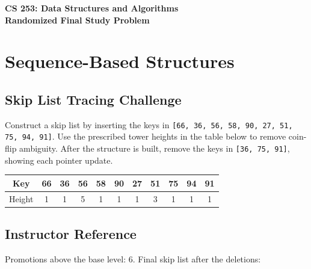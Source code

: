 \documentclass[11pt]{article}
\begin{document}
\begin{center}
    \Large\textbf{CS 253: Data Structures and Algorithms}\\
    \large\textbf{Randomized Final Study Problem}
\end{center}
\vspace{1em}


\section*{Sequence-Based Structures}
\subsection*{Skip List Tracing Challenge}
Construct a skip list by inserting the keys in \texttt{[66, 36, 56, 58, 90, 27, 51, 75, 94, 91]}. Use the prescribed tower heights in the table below to remove coin-flip ambiguity. After the structure is built, remove the keys in \texttt{[36, 75, 91]}, showing each pointer update.

\begin{center}
\begin{tabular}{|c|c|c|c|c|c|c|c|c|c|c|}
\hline
 Key & 66 & 36 & 56 & 58 & 90 & 27 & 51 & 75 & 94 & 91 \\
\hline
 Height & 1 & 1 & 5 & 1 & 1 & 1 & 3 & 1 & 1 & 1 \\
\hline
\end{tabular}
\end{center}

\subsection*{Instructor Reference}
Promotions above the base level: 6. Final skip list after the deletions:
\begin{center}
\end{center}
\end{document}
